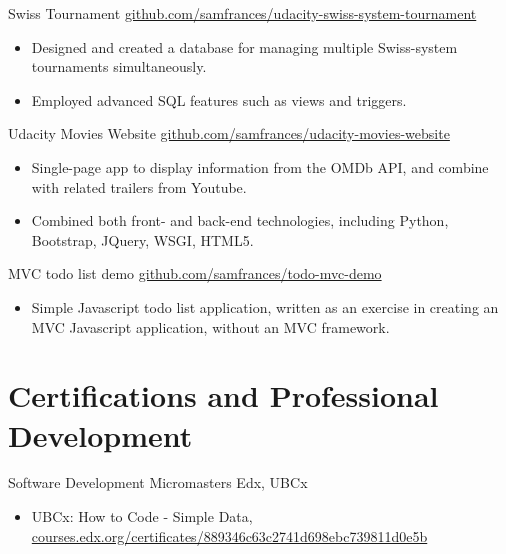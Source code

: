 \documentclass[10pt,a4paper,sans]{moderncv} %
\begin{document}
    { Swiss Tournament}{}{}
    {\href{ http://www.github.com/samfrances/udacity-swiss-system-tournament }{ github.com/samfrances/udacity-swiss-system-tournament }}
    {        \begin{itemize}
            \item{Designed and created a database for managing multiple Swiss-system tournaments simultaneously.}
            \item{Employed advanced SQL features such as views and triggers.}
        \end{itemize}
}
    { Udacity Movies Website}{}{}
    {\href{ http://www.github.com/samfrances/udacity-movies-website }{ github.com/samfrances/udacity-movies-website }}
    {        \begin{itemize}
            \item{Single-page app to display information from the OMDb API, and combine with related trailers from Youtube.}
            \item{Combined both front- and back-end technologies, including Python, Bootstrap, JQuery, WSGI, HTML5.}
        \end{itemize}
}
    { MVC todo list demo}{}{}
    {\href{ http://www.github.com/samfrances/todo-mvc-demo }{ github.com/samfrances/todo-mvc-demo }}
    {        \begin{itemize}
            \item{Simple Javascript todo list application, written as an exercise in creating an MVC Javascript application, without an MVC framework.}
        \end{itemize}
}



\section{Certifications and Professional Development}

    {Software Development Micromasters}
    {Edx, UBCx}{}
    {}
    {        \begin{itemize}
            \item{ UBCx: How to Code - Simple Data, \href{ https://courses.edx.org/certificates/889346c63c2741d698ebc739811d0e5b }{ courses.edx.org/certificates/889346c63c2741d698ebc739811d0e5b } }
        \end{itemize}
}
\end{document}
